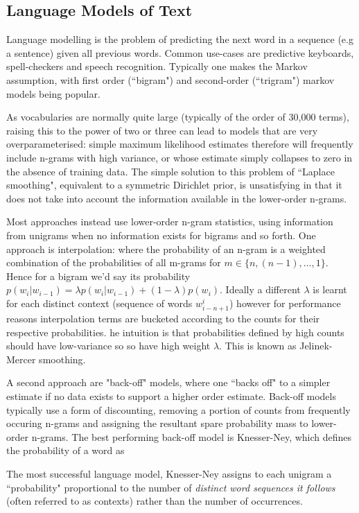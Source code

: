 

\subsection{Language Models of Text}

Language modelling is the problem of predicting the next word in a sequence (e.g a sentence) given all previous words. Common use-cases are predictive keyboards, spell-checkers and speech recognition. Typically one makes the Markov assumption, with first order (``bigram") and second-order (``trigram") markov models being popular.

As vocabularies are normally quite large (typically of the order of 30,000 terms), raising this to the power of two or three can lead to models that are very overparameterised: simple maximum likelihood estimates therefore will frequently include n-grams with high variance, or whose estimate simply collapses to zero in the absence of training data. The simple solution to this problem  of ``Laplace smoothing", equivalent to a symmetric Dirichlet prior, is unsatisfying in that it does not take into account the information available in the lower-order n-grams.

Most approaches instead use lower-order n-gram statistics, using information from unigrams when no information exists for bigrams and so forth. One approach is interpolation: where the probability of an n-gram is a weighted combination of the probabilities of all m-grams for $m \in \{n, (n-1), \ldots, 1\}$. Hence for a bigram we'd say its probability $p(w_i|w_{i-1}) = \lambda p(w_i|w_{i-1}) + (1 - \lambda) p(w_i)$. Ideally a different $\lambda$ is learnt for each distinct context (sequence of words $w^i_{i-n+1}$) however for performance reasons interpolation terms are bucketed according to the counts for their respective probabilities. he intuition is that probabilities defined by high counts should have low-variance so so have high weight $\lambda$. This is known as Jelinek-Mercer smoothing.

A second approach are "back-off" models, where one ``backs off" to a simpler estimate if no data exists to support a higher order estimate. Back-off models typically use a form of discounting, removing a portion of counts from frequently occuring n-grams and assigning the resultant spare probability mass to lower-order n-grams. The best performing back-off model is Knesser-Ney, which defines the probability of a word as 

The most successful language model, Knesser-Ney assigns to each unigram a ``probability" proportional to the number of \emph{distinct word sequences it follows} (often referred to as contexts) rather than the number of occurrences. 

